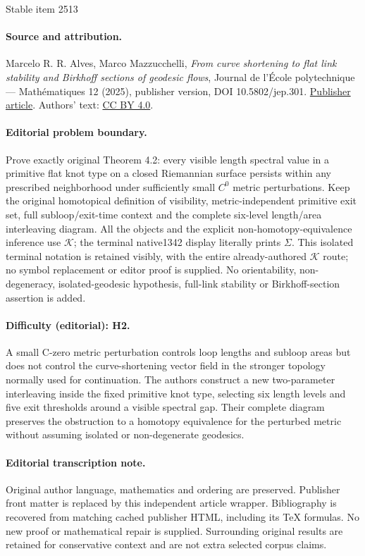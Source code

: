 \documentclass[11pt]{article}
\theoremstyle{plain}
\theoremstyle{definition}
\begin{document}
\begin{center}{\Large Stable item 2513}\end{center}
\paragraph{Source and attribution.}
Marcelo R. R. Alves, Marco Mazzucchelli, \emph{From curve shortening to flat link stability and Birkhoff sections of geodesic flows}, Journal de l’École polytechnique — Mathématiques 12 (2025), publisher version, DOI 10.5802/jep.301. \href{https://jep.centre-mersenne.org/articles/10.5802/jep.301/}{Publisher article}. Authors' text: \href{https://creativecommons.org/licenses/by/4.0/}{CC BY 4.0}.
\paragraph{Editorial problem boundary.}
Prove exactly original Theorem 4.2: every visible length spectral value in a primitive flat knot type on a closed Riemannian surface persists within any prescribed neighborhood under sufficiently small $C^0$ metric perturbations. Keep the original homotopical definition of visibility, metric-independent primitive exit set, full subloop/exit-time context and the complete six-level length/area interleaving diagram. All the objects and the explicit non-homotopy-equivalence inference use $\mathcal K$; the terminal native1342 display literally prints $\Sigma$. This isolated terminal notation is retained visibly, with the entire already-authored $\mathcal K$ route; no symbol replacement or editor proof is supplied. No orientability, non-degeneracy, isolated-geodesic hypothesis, full-link stability or Birkhoff-section assertion is added.
\paragraph{Difficulty (editorial): H2.}
A small C-zero metric perturbation controls loop lengths and subloop areas but does not control the curve-shortening vector field in the stronger topology normally used for continuation. The authors construct a new two-parameter interleaving inside the fixed primitive knot type, selecting six length levels and five exit thresholds around a visible spectral gap. Their complete diagram preserves the obstruction to a homotopy equivalence for the perturbed metric without assuming isolated or non-degenerate geodesics.
\paragraph{Editorial transcription note.}
Original author language, mathematics and ordering are preserved. Publisher front matter is replaced by this independent article wrapper. Bibliography is recovered from matching cached publisher HTML, including its TeX formulas. No new proof or mathematical repair is supplied. Surrounding original results are retained for conservative context and are not extra selected corpus claims.
\clearpage
\end{document}
